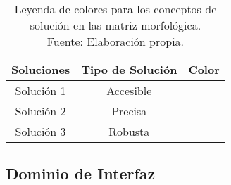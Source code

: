 \begin{table}[H]
	\centering
	\captionsetup{justification=centering}
	\caption[Leyenda de colores para los conceptos de solución en las matriz morfológica.]{Leyenda de colores para los conceptos de solución en las matriz morfológica.\\Fuente: Elaboración propia.}
	\begin{tabular}{|c|c|c|}
		\hline
		\textbf{Soluciones} & \textbf{Tipo de Solución} & \textbf{Color} \bigstrut\\
		\hline
		Solución 1 & Accesible & \cellcolor[rgb]{1,0,0} \bigstrut\\
		\hline
		Solución 2 & Precisa & \cellcolor[rgb]{0,0,1} \bigstrut\\
		\hline
		Solución 3 & Robusta & \cellcolor[rgb]{.298, .835, .078} \bigstrut\\
		\hline
	\end{tabular}%
	\label{tab:leyenda_colores_soluciones}%
\end{table}

\subsection{Dominio de Interfaz}

